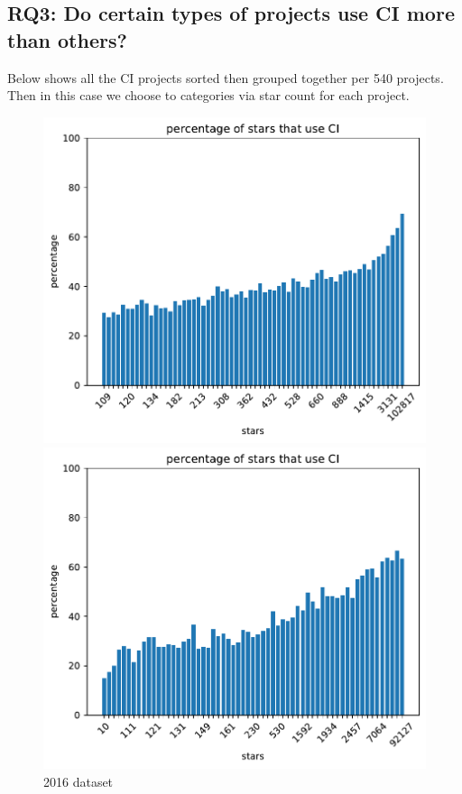 \documentclass[twoside,12pt,titlepage,a4paper]{article}
\begin{document}
\vspace*{-0.05in}
\subsection{\textbf{RQ3}: Do certain types of projects use CI more than others?}  
\label{section:RQ3}
\vspace*{-0.05in}

Below shows all the CI projects sorted then grouped together per 540 projects. Then in this case we choose to categories via star count for each project. 

\begin{figure}[!htbp]
  \centering
  \begin{minipage}{.48\textwidth}
    \centering
    \includegraphics[width=.9\textwidth]{../src/results/percentage sub with CI other paper source.pdf}
    \caption[]{2016 dataset}
    \label{fig:test2}
  \end{minipage}
  \begin{minipage}{.48\textwidth}
    \centering
    \includegraphics[width=.9\textwidth]{../src/results/percentage stars with CI.pdf}

\end{minipage}
\end{figure}
\end{document}
